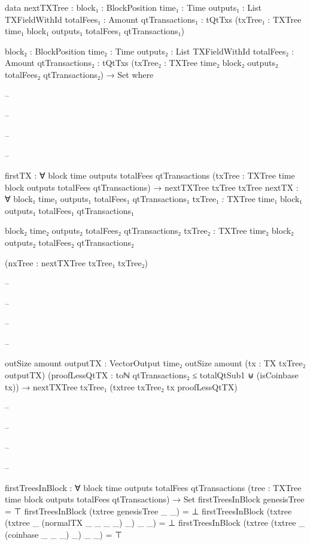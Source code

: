 \documentclass{beamer}
\begin{document}
{\begin{frame}
\begin{code}
      data nextTXTree :
        {block₁ : BlockPosition}
        {time₁ : Time}
        {outputs₁ : List TXFieldWithId}
        {totalFees₁ : Amount}
        {qtTransactions₁ : tQtTxs}
        (txTree₁ : TXTree time₁ block₁ outputs₁
          totalFees₁ qtTransactions₁)

        {block₂ : BlockPosition}
        {time₂ : Time}
        {outputs₂ : List TXFieldWithId}
        {totalFees₂ : Amount}
        {qtTransactions₂ : tQtTxs}
        (txTree₂ : TXTree time₂ block₂ outputs₂
          totalFees₂ qtTransactions₂)
        → Set where

-- \end{code}
-- \end{frame}
-- \begin{frame}
-- \begin{code}

        firstTX : ∀ {block time outputs totalFees qtTransactions}
          (txTree : TXTree time block outputs totalFees qtTransactions)
          → nextTXTree txTree txTree
        nextTX : ∀ {block₁ time₁ outputs₁ totalFees₁ qtTransactions₁}
          {txTree₁ : TXTree time₁ block₁
            outputs₁ totalFees₁ qtTransactions₁}

          {block₂ time₂ outputs₂ totalFees₂ qtTransactions₂}
          {txTree₂ : TXTree time₂ block₂
            outputs₂ totalFees₂ qtTransactions₂}

          (nxTree : nextTXTree txTree₁ txTree₂)

-- \end{code}
-- \end{frame}
-- \begin{frame}
-- \begin{code}

          {outSize amount}
          {outputTX : VectorOutput time₂ outSize amount}
          (tx : TX txTree₂ outputTX)
          (proofLessQtTX :
              toℕ qtTransactions₂ ≤ totalQtSub1
              ⊎
              (isCoinbase tx))
          → nextTXTree txTree₁ (txtree txTree₂ tx proofLessQtTX)

-- \end{code}
-- \end{frame}
-- \begin{frame}
-- \begin{code}

      firstTreesInBlock : ∀
        {block time outputs totalFees qtTransactions}
        (tree : TXTree time block outputs totalFees qtTransactions)
        → Set
      firstTreesInBlock genesisTree = ⊤
      firstTreesInBlock (txtree genesisTree _ _) = ⊥
      firstTreesInBlock (txtree (txtree _
        (normalTX _ _ _ _) _) _ _) = ⊥
      firstTreesInBlock (txtree (txtree _
        (coinbase _ _ _) _) _ _) = ⊤


\end{code}
\end{frame}}
\end{document}
